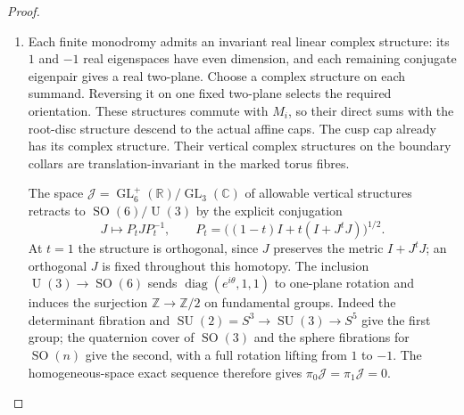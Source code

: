 \begin{proof}
\begin{enumerate}[label=\arabic*.]
These ranks determine the cohomology: $H^0$ of the image sheaf is
$\mathbb Q$ in coefficient degree one, $H^1$ is $\mathbb Q^3$ in
coefficient degree three, and every other entry in these four
coefficient degrees is zero. The cusp skyscraper kernel adds
$\mathbb Q$ to $H^0(R^4\pi_*\mathbb Q)$ and no higher cohomology.
Connected fibres give $R^0\pi_*\mathbb Q=\mathbb Q$.

In the Leray sequence
\cite[Tag 01F2, Lemma 20.13.4; chapter PDF p.~22]{StacksProject},
the only remaining low-degree differential is
$d_2^{0,1}:\mathbb Q\to\mathbb Q$. Its kernel is $H^1(M;\mathbb Q)=0$
by Step~2, so it is an isomorphism. Hence
$b_1=b_2=b_3=0$ and $b_4=3+1=4$. Poincar\'e duality determines all
remaining Betti numbers and gives \eqref{maps:eq:F.5}. Also, the
smooth and finite quotient fibres have Euler number zero, while the
Kuhn cusp has Euler number six by Theorem~\ref{night:P1.9}. Additivity
over the base strata therefore gives $\chi(M)=6$ directly.

\item Each finite monodromy admits an invariant real linear complex
structure: its $1$ and $-1$ real eigenspaces have even dimension, and
each remaining conjugate eigenpair gives a real two-plane. Choose
a complex structure on each summand. Reversing it on one fixed
two-plane selects the required orientation. These structures commute
with $M_i$, so their direct sums with the root-disc structure descend
to the actual affine caps. The cusp cap already has its complex
structure. Their vertical complex structures on the boundary collars
are translation-invariant in the marked torus fibres.

The space $\mathcal J=\operatorname{GL}_6^+(\mathbb R)/
\operatorname{GL}_3(\mathbb C)$ of allowable vertical structures
retracts to $\operatorname{SO}(6)/\operatorname{U}(3)$ by the explicit
conjugation
\[
 J\longmapsto P_tJP_t^{-1},
 \qquad P_t=\bigl((1-t)I+t(I+J^tJ)\bigr)^{1/2}.
\]
At $t=1$ the structure is orthogonal, since $J$ preserves the metric
$I+J^tJ$; an orthogonal $J$ is fixed throughout this homotopy.
The inclusion $\operatorname{U}(3)\to\operatorname{SO}(6)$ sends
$\operatorname{diag}(e^{i\theta},1,1)$ to one-plane rotation and
induces the surjection $\mathbb Z\to\mathbb Z/2$ on fundamental
groups. Indeed the determinant fibration and
$\operatorname{SU}(2)=S^3\to\operatorname{SU}(3)\to S^5$ give the
first group; the quaternion cover of $\operatorname{SO}(3)$ and
the sphere fibrations for $\operatorname{SO}(n)$ give the second,
with a full rotation lifting from $1$ to $-1$. The homogeneous-space
exact sequence therefore gives $\pi_0\mathcal J=\pi_1\mathcal J=0$.


\end{enumerate}
\end{proof}
